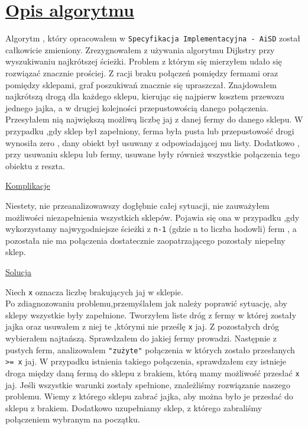 \documentclass{article}
\begin{document}
\section{\textbf{\underline{Opis algorytmu}}}

\indent  Algorytm , który opracowałem w \verb|Specyfikacja Implementacyjna - AiSD| został całkowicie zmieniony. Zrezygnowałem z używania algorytmu Dijkstry przy wyszukiwaniu najkrótszej ścieżki. Problem z którym się mierzyłem udało się rozwiązać znacznie prościej. Z racji braku połączeń pomiędzy fermami oraz pomiędzy sklepami, graf poszukiwań znacznie się upraszczał. Znajdowałem najkrótszą drogą dla każdego sklepu, kierując się najpierw kosztem przewozu jednego jajka, a w drugiej kolejności przepustowością danego połączenia. Przesyłałem nią największą możliwą liczbę jaj z danej fermy do danego sklepu. W przypadku ,gdy sklep był zapełniony, ferma była pusta lub przepustowość drogi wynosiła zero , dany obiekt był usuwany z odpowiadającej mu listy. Dodatkowo , przy usuwaniu sklepu lub fermy, usuwane były również wszystkie połączenia tego obiektu z reszta.\\
\begin{center}
\underline{Komplikacje}
\end{center}
Niestety, nie przeanalizowawszy dogłębnie całej sytuacji, nie zauważyłem możliwości niezapełnienia wszystkich sklepów. Pojawia się ona w przypadku ,gdy wykorzystamy najwygodniejsze ścieżki z \verb|n-1| (gdzie n to liczba hodowli) ferm , a pozostała nie ma połączenia dostatecznie zaopatrzającego pozostały niepełny sklep.
\begin{center}
\underline{Solucja}
\end{center}
Niech \verb|x| oznacza liczbę brakujących jaj w sklepie.\\
Po zdiagnozowaniu problemu,przemyślałem jak należy poprawić sytuację, aby sklepy wszystkie były zapełnione. Tworzyłem liste dróg z fermy w której zostały jajka oraz usuwałem z niej te ,którymi nie prześlę \verb|x| jaj. Z pozostałych dróg wybierałem najtańszą. Sprawdzałem do jakiej fermy prowadzi. Następnie z pustych ferm, analizowałem \verb|"zużyte"|  połączenia w których zostało przesłanych \verb| >= x| jaj.  W przypadku istnienia takiego połączenia, sprawdzałem czy istnieje droga między daną fermą do sklepu z brakiem, którą mamy możliwość przesłać \verb|x| jaj. Jeśli wszystkie warunki zostały spełnione, znależliśmy rozwiązanie naszego problemu. Wiemy z którego sklepu zabrać jajka, aby można było je przesłać do sklepu z brakiem. Dodatkowo uzupełniamy sklep, z którego zabraliśmy połączeniem wybranym na początku.
\end{document}

